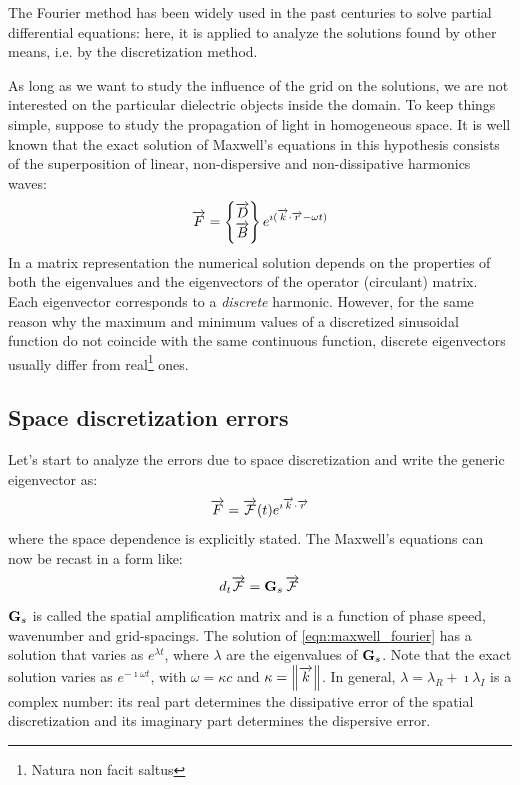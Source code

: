 The Fourier method has been widely used in the past centuries to solve
partial differential equations: here, it is applied to analyze the
solutions found by other means, i.e. by the discretization method.

As long as we want to study the influence of the grid on the
solutions, we are not interested on the particular dielectric objects
inside the domain. To keep things simple, suppose to study the
propagation of light in homogeneous space. It is well known that the
exact solution of Maxwell's equations in this hypothesis consists of
the superposition of linear, non-dispersive and non-dissipative
harmonics waves:
\begin{equation} \label{eqn:maxwell_fourier_solution}
\overrightarrow{F} = \begin{Bmatrix} \overrightarrow{D} \\ \overrightarrow{B} \end{Bmatrix}
e^{\imath({\overrightarrow{k} \cdot \overrightarrow{r}} - \omega t)}
\end{equation}
In a matrix representation  the numerical solution depends on the
properties of both the eigenvalues and the eigenvectors of the
operator (circulant) matrix. Each eigenvector corresponds to a
\emph{discrete} harmonic. However, for the same reason why the maximum
and minimum values of a discretized sinusoidal function do not
coincide with the same continuous function, discrete eigenvectors
usually differ from real\footnote{Natura non facit saltus}
ones.

\subsection{Space discretization errors}

Let's start to analyze the errors due to space discretization and
write the generic eigenvector as:
$$
\overrightarrow{F} = \overrightarrow{\mathcal{F}}(t) e^{\imath {\overrightarrow{k}\cdot \overrightarrow{r}}}
$$
where the space dependence is explicitly stated. The Maxwell's
equations can now be recast in a form like:
\begin{equation} \label{eqn:maxwell_fourier}
d_t \overrightarrow{\mathcal{F}} = {\mathbf{G}_s\,\overrightarrow{\mathcal{F}}}
\end{equation}
$\mathbf{G}_s$ is called the spatial amplification matrix and is a
function of phase speed, wavenumber and grid-spacings. The solution of
\eqref{eqn:maxwell_fourier} has a solution that varies as $e^{\lambda
  t}$, where $\lambda$ are the eigenvalues of $\mathbf{G}_s$. Note
that the exact solution varies as $e^{-\imath \omega t}$, with $\omega
= \kappa c$ and $\kappa = \left\lVert\overrightarrow{k}\right\rVert$. In general, $\lambda = \lambda_R
+ \imath \lambda_I$ is a complex number: its real part determines the
dissipative error of the spatial discretization and its imaginary part
determines the dispersive error.

